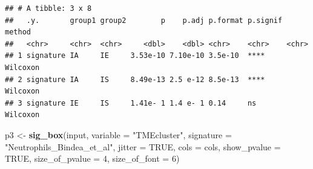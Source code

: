 \documentclass[
  12pt,
]{book}
\newenvironment{Shaded}{\begin{snugshade}}{\end{snugshade}}
\newcommand{\AttributeTok}[1]{\textcolor[rgb]{0.13,0.29,0.53}{#1}}
\newcommand{\ConstantTok}[1]{\textcolor[rgb]{0.56,0.35,0.01}{#1}}
\newcommand{\DecValTok}[1]{\textcolor[rgb]{0.00,0.00,0.81}{#1}}
\newcommand{\FunctionTok}[1]{\textcolor[rgb]{0.13,0.29,0.53}{\textbf{#1}}}
\newcommand{\NormalTok}[1]{#1}
\newcommand{\OtherTok}[1]{\textcolor[rgb]{0.56,0.35,0.01}{#1}}
\newcommand{\SpecialCharTok}[1]{\textcolor[rgb]{0.81,0.36,0.00}{\textbf{#1}}}
\newcommand{\StringTok}[1]{\textcolor[rgb]{0.31,0.60,0.02}{#1}}
\begin{document}
\begin{Shaded}
\end{Shaded}

\begin{verbatim}
## # A tibble: 3 x 8
##   .y.       group1 group2        p    p.adj p.format p.signif method  
##   <chr>     <chr>  <chr>     <dbl>    <dbl> <chr>    <chr>    <chr>   
## 1 signature IA     IE     3.53e-10 7.10e-10 3.5e-10  ****     Wilcoxon
## 2 signature IA     IS     8.49e-13 2.5 e-12 8.5e-13  ****     Wilcoxon
## 3 signature IE     IS     1.41e- 1 1.4 e- 1 0.14     ns       Wilcoxon
\end{verbatim}

\begin{Shaded}
\begin{Highlighting}[]
\NormalTok{p3 }\OtherTok{\textless{}{-}} \FunctionTok{sig\_box}\NormalTok{(input, }\AttributeTok{variable =} \StringTok{"TMEcluster"}\NormalTok{, }\AttributeTok{signature =} \StringTok{"Neutrophils\_Bindea\_et\_al"}\NormalTok{,  }
              \AttributeTok{jitter =} \ConstantTok{TRUE}\NormalTok{, }\AttributeTok{cols =}\NormalTok{  cols, }\AttributeTok{show\_pvalue =} \ConstantTok{TRUE}\NormalTok{, }\AttributeTok{size\_of\_pvalue =} \DecValTok{4}\NormalTok{, }\AttributeTok{size\_of\_font =} \DecValTok{6}\NormalTok{)}
\end{Highlighting}
\end{Shaded}
\end{document}
